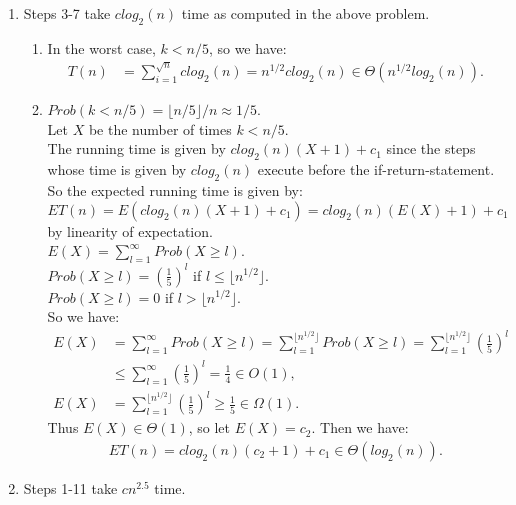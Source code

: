\documentclass[10pt,oneside,reqno]{amsart}
\theoremstyle{plain}
\theoremstyle{definition}
\begin{document}
\begin{enumerate}[label=\arabic*.]
\item Steps 3-7 take $clog_2(n)$ time as computed in the above problem. 
\begin{enumerate}
\item In the worst case, $k < n/5$, so we have:
\begin{equation}
\begin{aligned}
T(n) &= \sum_{i = 1}^{\sqrt{n}}clog_2(n) = n^{1/2}clog_2(n) \in \Theta(n^{1/2}log_2(n)). 
\end{aligned}
\end{equation}
\item $Prob(k < n/5) = \lfloor n/5 \rfloor / n \approx 1/5$. \\
Let $X$ be the number of times $k<n/5$. \\
The running time is given by $clog_2(n)(X + 1) + c_1$ since the steps whose time is given by $clog_2(n)$ execute before the if-return-statement. \\
So the expected running time is given by: $ET(n) = E(clog_2(n)(X + 1) + c_1) = clog_2(n)(E(X) + 1) + c_1$ by linearity of expectation. \\
$E(X) = \sum_{l = 1}^{\infty}Prob(X \geq l)$. \\
$Prob(X \geq l) = \left(\frac{1}{5}\right)^{l}$ if $l \leq \lfloor n^{1/2} \rfloor$. \\
$Prob(X \geq l) = 0$ if $l > \lfloor n^{1/2} \rfloor$. \\
So we have:
\begin{equation}
\begin{aligned}
E(X) &= \sum_{l = 1}^{\infty}Prob(X \geq l) = \sum_{l = 1}^{\lfloor n^{1/2} \rfloor}Prob(X \geq l) = \sum_{l = 1}^{\lfloor n^{1/2} \rfloor}\left(\frac{1}{5}\right)^{l}\\
&\leq \sum_{l = 1}^{\infty}\left(\frac{1}{5}\right)^{l} = \frac{1}{4} \in O(1),\\
E(X) &= \sum_{l = 1}^{\lfloor n^{1/2} \rfloor}\left(\frac{1}{5}\right)^{l} \geq \frac{1}{5} \in \Omega(1). 
\end{aligned}
\end{equation}
Thus $E(X) \in \Theta(1)$, so let $E(X) = c_2$. Then we have:
\begin{equation}
\begin{aligned}
ET(n) = clog_2(n)(c_2 + 1) + c_1 \in \Theta(log_2(n)). 
\end{aligned}
\end{equation}
\end{enumerate}
\item Steps 1-11 take $cn^{2.5}$ time. 

\end{enumerate}
\end{document}
